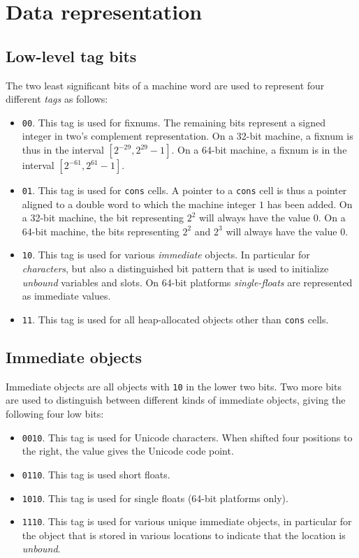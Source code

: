 \chapter{Data representation}
\label{chap-data-representation}

\section{Low-level tag bits}

The two least significant bits of a machine word are used to represent
four different \emph{tags} as follows:

\begin{itemize}
\item \texttt{00}.  This tag is used for fixnums.  The remaining bits
  represent a signed integer in two's complement representation.  On a
  32-bit machine, a fixnum is thus in the interval $[2^{-29}, 2^{29} -
    1]$.  On a 64-bit machine, a fixnum is in the interval $[2^{-61}, 2^{61} -
    1]$.  
\item \texttt{01}.  This tag is used for \texttt{cons} cells.  A
  pointer to a \texttt{cons} cell is thus a pointer aligned to a
  double word to which the machine integer $1$ has been added.  On a
  32-bit machine, the bit representing $2^2$ will always have the
  value $0$.  On a 64-bit machine, the bits representing $2^2$ and
  $2^3$ will always have the value $0$.
\item \texttt{10}.  This tag is used for various \emph{immediate}
  objects.  In particular for \emph{characters}, but also a
  distinguished bit pattern that is used to initialize \emph{unbound}
  variables and slots.  On 64-bit platforms \emph{single-floats} are
  represented as immediate values. 
\item \texttt{11}.  This tag is used for all heap-allocated objects
  other than \texttt{cons} cells.
\end{itemize}

\section{Immediate objects}

Immediate objects are all objects with \texttt{10} in the lower two
bits.  Two more bits are used to distinguish between different kinds
of immediate objects, giving the following four low bits:

\begin{itemize}
\item \texttt{0010}.  This tag is used for Unicode characters.  When
  shifted four positions to the right, the value gives the Unicode
  code point. 
\item \texttt{0110}.  This tag is used short floats.  
\item \texttt{1010}.  This tag is used for single floats (64-bit
  platforms only). 
\item \texttt{1110}.  This tag is used for various unique immediate
  objects, in particular for the object that is stored in various
  locations to indicate that the location is \emph{unbound}. 
\end{itemize}

